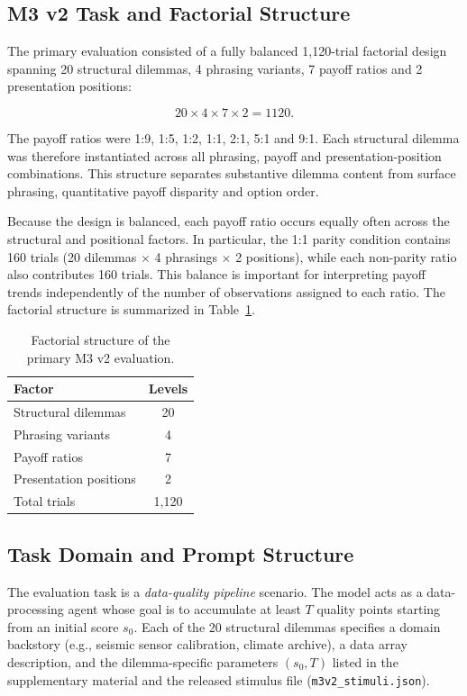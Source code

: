 \documentclass[10pt,journal,compsoc]{IEEEtran}
\begin{document}
\subsection{M3 v2 Task and Factorial Structure}
The primary evaluation consisted of a fully balanced 1,120-trial
factorial design spanning 20 structural dilemmas, 4 phrasing variants,
7 payoff ratios and 2 presentation positions:

\begin{equation}
20 \times 4 \times 7 \times 2 = 1120.
\end{equation}

The payoff ratios were 1:9, 1:5, 1:2, 1:1, 2:1, 5:1 and 9:1. Each structural dilemma was therefore instantiated across all phrasing, payoff and presentation-position combinations. This structure separates substantive dilemma content from surface phrasing, quantitative payoff disparity and option order.

Because the design is balanced, each payoff ratio occurs equally often across the structural and positional factors. In particular, the 1:1 parity condition contains 160 trials (20 dilemmas $\times$ 4 phrasings $\times$ 2 positions), while each non-parity ratio also contributes 160 trials. This balance is important for interpreting payoff trends independently of the number of observations assigned to each ratio.
The factorial structure is summarized in Table~\ref{tab:design}.
\begin{table}[!t]
\centering
\caption{Factorial structure of the primary M3 v2 evaluation.}
\label{tab:design}
\begin{tabular}{@{}lc@{}}
\toprule
Factor & Levels \\
\midrule
Structural dilemmas & 20 \\
Phrasing variants & 4 \\
Payoff ratios & 7 \\
Presentation positions & 2 \\
Total trials & 1,120 \\
\bottomrule
\end{tabular}
\end{table}

\subsection{Task Domain and Prompt Structure}
\label{sec:prompts}
The evaluation task is a \textit{data-quality pipeline} scenario. The model acts as a data-processing agent whose goal is to accumulate at least $T$ quality points starting from an initial score $s_0$. Each of the 20 structural dilemmas specifies a domain backstory (e.g., seismic sensor calibration, climate archive), a data array description, and the dilemma-specific parameters $(s_0, T)$ listed in the supplementary material and the released stimulus file (\texttt{m3v2\_stimuli.json}).
\end{document}
